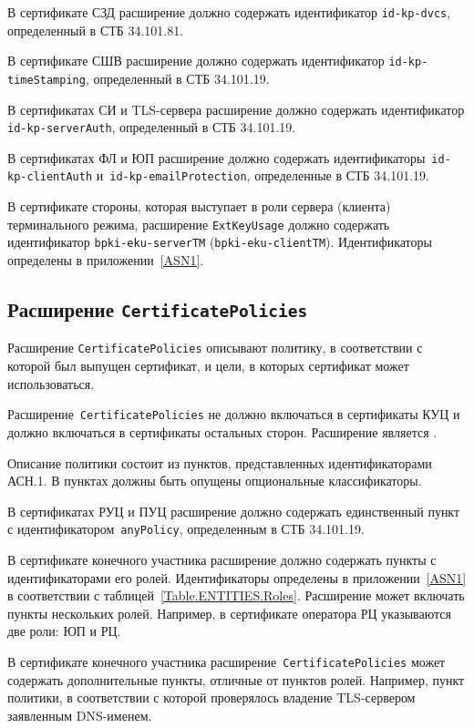 В сертификате СЗД расширение должно содержать
идентификатор \verb|id-kp-dvcs|, определенный в СТБ 34.101.81.

В сертификате СШВ расширение должно содержать
идентификатор \verb|id-kp-timeStamping|, определенный в СТБ 34.101.19.

В сертификатах СИ и TLS-сервера расширение должно содержать
идентификатор \verb|id-kp-serverAuth|, определенный в СТБ 34.101.19.

В сертификатах ФЛ и ЮП расширение должно содержать
идентификаторы~\verb|id-kp-clientAuth| и~\verb|id-kp-emailProtection|, 
определенные в СТБ 34.101.19.

В сертификате стороны, которая выступает в роли сервера (клиента) 
терминального режима, расширение \texttt{ExtKeyUsage} должно содержать 
идентификатор \verb|bpki-eku-serverTM|  
(\verb|bpki-eku-clientTM|). Идентификаторы определены в приложении~\ref{ASN1}.


\subsection{Расширение \texttt{CertificatePolicies}}\label{FMT.Ext.CP}

Расширение \texttt{CertificatePolicies} описывают политику, в соответствии 
с которой был выпущен сертификат, и цели, в которых сертификат может 
использоваться. 

Расширение~\texttt{CertificatePolicies} не должно включаться в сертификаты
КУЦ и должно включаться в сертификаты остальных сторон. 
Расширение является .

Описание политики состоит из пунктов, представленных идентификаторами 
АСН.1. В пунктах должны быть опущены опциональные классификаторы. 

В сертификатах РУЦ и ПУЦ расширение должно содержать единственный пункт
с идентификатором~\texttt{anyPolicy}, определенным в СТБ 34.101.19.

В сертификате конечного участника расширение 
должно содержать пункты с идентификаторами его ролей.
Идентификаторы определены в приложении~\ref{ASN1}
в соответствии с таблицей~\ref{Table.ENTITIES.Roles}. 
Расширение может включать пункты нескольких ролей.
Например, в сертификате оператора РЦ указываются две роли: ЮП и РЦ.

В сертификате конечного участника расширение~\texttt{CertificatePolicies} 
может содержать дополнительные пункты, отличные от пунктов 
ролей. Например, пункт политики, в соответствии с которой 
проверялось владение TLS-сервером заявленным DNS-именем.

